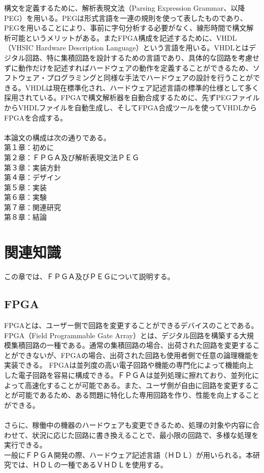 \documentclass[12pt,oneside]{report}
\begin{document}
構文を定義するために、解析表現文法（Parsing Expression Grammar、以降PEG）を用いる。PEGは形式言語を一連の規則を使って表したものであり、PEGを用いることにより、事前に字句分析する必要がなく、線形時間で構文解析可能というメリットがある。またFPGA構成を記述するために、VHDL（VHSIC Hardware Description Language）という言語を用いる。VHDLとはデジタル回路、特に集積回路を設計するための言語であり、具体的な回路を考慮せずに動作だけを記述すればハードウェアの動作を定義することができるため、ソフトウェア・プログラミングと同様な手法でハードウェアの設計を行うことができる。VHDLは現在標準化され、ハードウェア記述言語の標準的仕様として多く採用されている。FPGAで構文解析器を自動合成するために、先ずPEGファイルからVHDLファイルを自動生成し、そしてFPGA合成ツールを使ってVHDLからFPGAを合成する。\\
\\

本論文の構成は次の通りである。
\\
第１章：初めに\\
第２章：ＦＰＧＡ及び解析表現文法ＰＥＧ\\
第３章：実装方針\\
第４章：デザイン\\
第５章：実装\\
第６章：実験\\
第７章：関連研究\\
第８章：結論\\

\chapter{関連知識}
この章では、ＦＰＧＡ及びＰＥＧについて説明する。

\section{FPGA}
FPGAとは、ユーザー側で回路を変更することができるデバイスのことである。
FPGA（Field Programmable Gate Array）とは、デジタル回路を構築する大規模集積回路の一種である。通常の集積回路の場合、出荷された回路を変更することができないが、FPGAの場合、出荷された回路も使用者側で任意の論理機能を実装できる。
FPGAは並列度の高い電子回路や機能の専門化によって機能向上した電子回路を容易に構成できる。ＦＰＧＡは並列処理に擦れており、並列化によって高速化することが可能である。また、ユーザ側が自由に回路を変更することが可能であるため、ある問題に特化した専用回路を作り、性能を向上することができる。\\
\\
さらに、稼働中の機器のハードウェアも変更できるため、処理の対象や内容に合わせて、状況に応じた回路に書き換えることで、最小限の回路で、多様な処理を実行できる。\\
一般にＦＰＧＡ開発の際、ハードウェア記述言語（ＨＤＬ）が用いられる。本研究では、ＨＤＬの一種であるＶＨＤＬを使用する。
\end{document}
